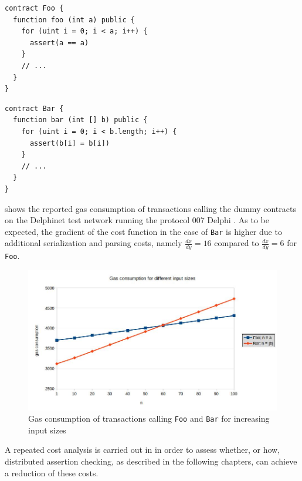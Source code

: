 \begin{lstlisting}[numbers=none, language=Solidity, caption=Simple dummy contract executing a loop]
contract Foo {
  function foo (int a) public {
    for (uint i = 0; i < a; i++) {
      assert(a == a)
	}
	// ...
  }
}
\end{lstlisting}
\begin{lstlisting}[numbers=none, language=Solidity, caption=Simple dummy contract iterating over a list]
contract Bar {
  function bar (int [] b) public {
    for (uint i = 0; i < b.length; i++) {
      assert(b[i] = b[i])
	}
	// ...
  }
}
\end{lstlisting}

 shows the reported gas consumption of transactions calling the dummy contracts on the Delphinet test network running the protocol 007 Delphi \cite{tezos_docs}. As to be expected, the gradient of the cost function in the case of \texttt{Bar} is higher due to additional serialization and parsing costs, namely $\frac{dx}{dy} = 16$ compared to $\frac{dx}{dy} = 6$ for \texttt{Foo}.
\begin{figure}[t]
\centering
\includegraphics[width=0.9\linewidth]{figures/2-use_cases/cost_analysis}
\caption{Gas consumption of transactions calling \texttt{Foo} and \texttt{Bar} for increasing input sizes}
\label{fig:use_case_cost}
\end{figure}

A repeated cost analysis is carried out in  in order to assess whether, or how, distributed assertion checking, as described in the following chapters, can achieve a reduction of these costs.